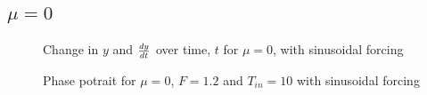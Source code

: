 \documentclass{article}
\begin{document}
\subsection{$\mu=0$}
\begin{figure}[H]
\centering 
\noindent{}%
\caption{Change in $y$ and $dy \over dt$  over time, $t$ for $\mu=0$, with sinusoidal forcing}
\end{figure}
\begin{figure}[H]
\centering 
\noindent{}%
\caption{Phase potrait for $\mu=0$, $F=1.2$ and $T_{in}=10$ with sinusoidal forcing}
\end{figure}
\end{document}
